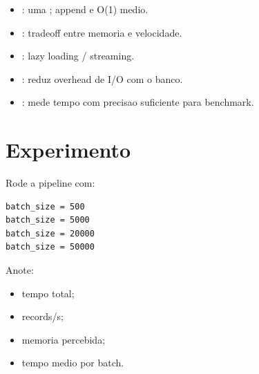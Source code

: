 \begin{itemize}
  \item {}: uma ; append e O(1) medio.
  \item {}: tradeoff entre memoria e velocidade.
  \item {}: lazy loading / streaming.
  \item {}: reduz overhead de I/O com o banco.
  \item {}: mede tempo com precisao suficiente para benchmark.
\end{itemize}

\section{Experimento}

Rode a pipeline com:

\begin{verbatim}
batch_size = 500
batch_size = 5000
batch_size = 20000
batch_size = 50000
\end{verbatim}

Anote:

\begin{itemize}
  \item tempo total;
  \item records/s;
  \item memoria percebida;
  \item tempo medio por batch.
\end{itemize}
